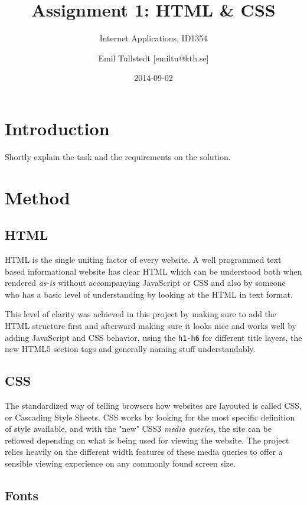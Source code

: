 \documentclass[a4paper]{scrartcl}
\title{Assignment 1: HTML \& CSS}
\subtitle{Internet Applications, ID1354}
\author{Emil Tullstedt [emiltu@kth.se]}
\date{2014-09-02}
\begin{document}
\maketitle

\section{Introduction}

Shortly explain the task and the requirements on the solution.

\section{Method}

\subsection{HTML}

HTML is the single uniting factor of every website. A well programmed text based informational website has clear HTML which can be understood both when rendered \textit{as-is} without accompanying JavaScript or CSS and also by someone who has a basic level of understanding by looking at the HTML in text format.

This level of clarity was achieved in this project by making sure to add the HTML structure first and afterward making sure it looks nice and works well by adding JavaScript and CSS behavior, using the \texttt{h1-h6} for different title layers, the new HTML5 section tags and generally naming stuff understandably.

\subsection{CSS}

The standardized way of telling browsers how websites are layouted is called CSS, or Cascading Style Sheets. CSS works by looking for the most specific definition of style available, and with the "new" CSS3 \textit{media queries}, the site can be reflowed depending on what is being used for viewing the website. The project relies heavily on the different width features of these media queries to offer a sensible viewing experience on any commonly found screen size.

\subsection{Fonts}
\end{document}
